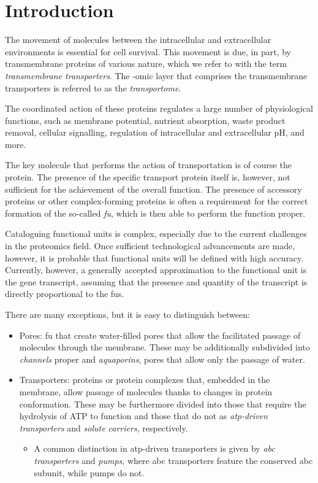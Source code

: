 \section{Introduction}

The movement of molecules between the intracellular and extracellular environments is essential for cell survival.
This movement is due, in part, by transmembrane proteins of various nature, which we refer to with the term \textit{transmembrane transporters}.
The -omic layer that comprises the transmembrane transporters is referred to as the \textit{transportome}.

The coordinated action of these proteins regulates a large number of physiological functions, such as membrane potential, nutrient absorption, waste product removal, cellular signalling, regulation of intracellular and extracellular pH, and more.

The key molecule that performs the action of transportation is of course the protein.
The presence of the specific transport protein itself is, however, not sufficient for the achievement of the overall function.
The presence of accessory proteins or other complex-forming proteins is often a requirement for the correct formation of the so-called \textit{\gls{fu}}, which is then able to perform the function proper.

Cataloguing functional units is complex, especially due to the current challenges in the proteomics field.
Once sufficient technological advancements are made, however, it is probable that functional units will be defined with high accuracy.
Currently, however, a generally accepted approximation to the functional unit is the gene transcript, assuming that the presence and quantity of the transcript is directly proportional to the \glspl{fu}.

There are many exceptions, but it is easy to distinguish between:

\begin{itemize}
    \item Pores: \gls{fu} that create water-filled pores that allow the facilitated passage of molecules through the membrane.
    These may be additionally subdivided into \textit{channels} proper and \textit{aquaporins}, pores that allow only the passage of water.
    \item Transporters: proteins or protein complexes that, embedded in the membrane, allow passage of molecules thanks to changes in protein conformation.
    These may be furthermore divided into those that require the hydrolysis of ATP to function and those that do not as \textit{atp-driven transporters} and \textit{solute carriers}, respectively.
    \begin{itemize}
        \item A common distinction in atp-driven transporters is given by \textit{\gls{abc} transporters} and \textit{pumps}, where \gls{abc} transporters feature the conserved \gls{abc} subunit, while pumps do not.
    \end{itemize}
\end{itemize}

